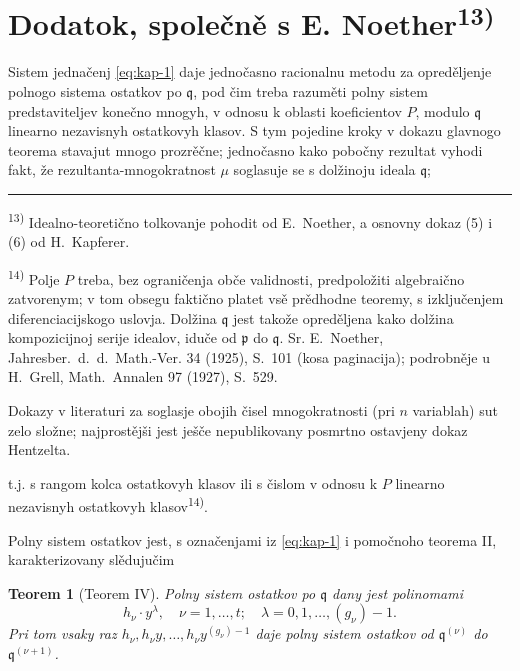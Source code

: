 \documentclass[11pt]{article}
\newcommand{\foreign}[1]{#1}
\theoremstyle{plain}
\newtheorem{satz}{Teorem}
\begin{document}
\newpage
\section*{Dodatok, společně s E. Noether\textsuperscript{13)}}

Sistem jednačenj \eqref{eq:kap-1} daje jednočasno racionalnu
metodu za opreděljenje polnogo sistema ostatkov po $\mathfrak{q}$,
pod čim treba razuměti polny sistem predstaviteljev konečno mnogyh,
v odnosu k oblasti koeficientov $P$, modulo $\mathfrak{q}$ linearno
nezavisnyh ostatkovyh klasov. S tym pojedine kroky v dokazu
glavnogo teorema stavajut mnogo prozrěčne; jednočasno kako
pobočny rezultat vyhodi fakt, že rezultanta-mnogokratnost $\mu$
soglasuje se s dolžinoju ideala $\mathfrak{q}$;

\vspace{0.5em}
\noindent\rule{\textwidth}{0.4pt}
\vspace{0.3em}

{\footnotesize
\textsuperscript{13)} Idealno-teoretično tolkovanje pohodit od E.\ Noether, a osnovny
dokaz (5) i (6) od H.\ Kapferer.

\textsuperscript{14)} Polje $P$ treba, bez ograničenja obče validnosti, predpoložiti
algebraično zatvorenym; v tom obsegu faktično platet vsě prědhodne
teoremy, s izključenjem diferenciacijskogo uslovja. Dolžina
$\mathfrak{q}$ jest takože opreděljena kako dolžina kompozicijnoj
serije idealov, iduče od $\mathfrak{p}$ do $\mathfrak{q}$. Sr.
E.\ Noether, \foreign{Jahresber.\ d.\ d.\ Math.-Ver.} 34 (1925), S.~101
(kosa paginacija); podrobněje u H.\ Grell, \foreign{Math.\ Annalen} 97
(1927), S.~529.

Dokazy v literaturi za soglasje obojih čisel mnogokratnosti (pri
$n$ variablah) sut zelo složne; najprostějši jest ješče nepublikovany
posmrtno ostavjeny dokaz Hentzelta.
}

\vspace{1em}
t.j. s rangom kolca ostatkovyh klasov ili s čislom v odnosu k $P$
linearno nezavisnyh ostatkovyh klasov\textsuperscript{14)}.

Polny sistem ostatkov jest, s označenjami iz \eqref{eq:kap-1} i
pomočnoho teorema II, karakterizovany slědujučim

\begin{satz}[Teorem IV]\label{satz:kap-IV}
Polny sistem ostatkov po $\mathfrak{q}$ dany jest polinomami
\[
h_{\nu} \cdot y^{\lambda}, \quad \nu = 1, \ldots, t; \quad \lambda = 0, 1, \ldots, (g_{\nu})-1.
\]
Pri tom vsaky raz
$h_{\nu}, h_{\nu}y, \ldots, h_{\nu}y^{(g_{\nu})-1}$ daje polny
sistem ostatkov od $\mathfrak{q}^{(\nu)}$ do
$\mathfrak{q}^{(\nu+1)}$.
\end{satz}
\end{document}
